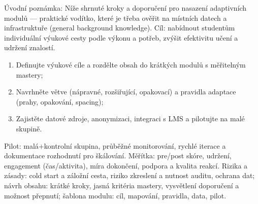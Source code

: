 Úvodní poznámka: Níže shrnuté kroky a doporučení pro nasazení adaptivních modulů — praktické vodítko, které je třeba ověřit na místních datech a infrastruktuře (general background knowledge).
Cíl: nabídnout studentům individuální výukové cesty podle výkonu a potřeb, zvýšit efektivitu učení a udržení znalostí.
\begin{enumerate}
\item Definujte výukové cíle a rozdělte obsah do krátkých modulů s měřitelným mastery; \item Navrhněte větve (nápravné, rozšiřující, opakovací) a pravidla adaptace (prahy, opakování, spacing); \item Zajistěte datové zdroje, anonymizaci, integraci s LMS a pilotujte na malé skupině.
\end{enumerate}
Pilot: malá+kontrolní skupina, průběžné monitorování, rychlé iterace a dokumentace rozhodnutí pro škálování.
Měřítka: pre/post skóre, udržení, engagement (čas/aktivita), míra dokončení, podpora a kvalita reakcí.
Rizika a zásady: cold start a záložní cesta, riziko zkreslení a nutnost auditu, ochrana dat; návrh obsahu: krátké kroky, jasná kritéria mastery, vysvětlení doporučení a možnost přepnutí; šablona modulu: cíl, mapování, pravidla, data, pilot.